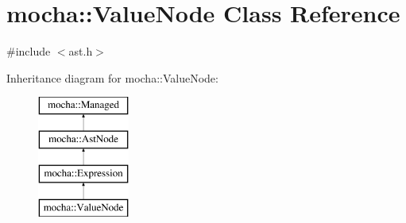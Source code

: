 \hypertarget{classmocha_1_1_value_node}{
\section{mocha::ValueNode Class Reference}
\label{classmocha_1_1_value_node}
}


{\ttfamily \#include $<$ast.h$>$}

Inheritance diagram for mocha::ValueNode:\begin{figure}[H]
\begin{center}
\leavevmode
\includegraphics[height=4.000000cm]{classmocha_1_1_value_node}
\end{center}
\end{figure}
